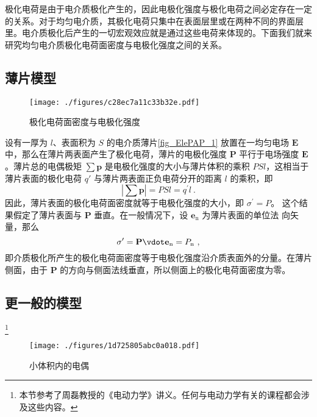 


极化电荷是由于电介质极化产生的，因此电极化强度与极化电荷之间必定存在一定的关系。对于均匀电介质，其极化电荷只集中在表面层里或在两种不同的界面层里。电介质极化后产生的一切宏观效应就是通过这些电荷来体现的。下面我们就来研究均匀电介质极化电荷面密度与电极化强度之间的关系。

\subsection{薄片模型}
\begin{figure}[ht]
\centering
\texttt{[image: ./figures/c28ec7a11c33b32e.pdf]}
\caption{极化电荷面密度与电极化强度} \label{fig_ElePAP_1}
\end{figure}
设有一厚为 $l$、表面积为 $S $ 的电介质薄片\autoref{fig_ElePAP_1} 放置在一均匀电场 $\mathbf E $ 中，那么在薄片两表面产生了极化电荷，薄片的电极化强度 $\mathbf P $ 平行于电场强度 $\mathbf E$。薄片总的电偶极矩 $\sum \mathbf p$ 是电极化强度的大小与薄片体积的乘积 $PSl$，这相当于薄片表面的极化电荷 $q' $ 与薄片两表面正负电荷分开的距离 $l $ 的乘积，即
\begin{equation}
\left|\sum \mathbf p\right|=P S l=q^{\prime} l~.
\end{equation}
因此，薄片表面的极化电荷面密度就等于电极化强度的大小，即 $\sigma^{\prime}=P$。
这个结果假定了薄片表面与 $\mathbf P $ 垂直。在一般情况下，设 $\mathbf e_\mathrm{n} $ 为薄片表面的单位法
向矢量，那么
\begin{equation}
\sigma^{\prime}=\mathbf P \vdot \mathbf e_{\mathrm{n}}=P_{\mathrm{n}}~,
\end{equation}
即介质极化所产生的极化电荷面密度等于电极化强度沿介质表面外的分量。在薄片侧面，由于 $\mathbf P $ 的方向与侧面法线垂直，所以侧面上的极化电荷面密度为零。

\subsection{更一般的模型}
\footnote{本节参考了周磊教授的《电动力学》讲义。任何与电动力学有关的课程都会涉及这些内容。}
\begin{figure}[ht]
\centering
\texttt{[image: ./figures/1d725805abc0a018.pdf]}
\caption{小体积内的电偶} \label{fig_ElePAP_2}
\end{figure}


